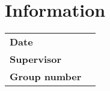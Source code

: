 \vspace{3 cm}

\restoregeometry
\newpage
\chapter*{Information}
\label{chap:info}

\begin{tabular}{l l}

	{\textbf{Date}} \hspace{1cm} & \hspace{1cm} {\datum}\\[0,2cm]
	{\textbf{Supervisor}} \hspace{1cm} & \hspace{1cm} {\betreuer}\\[1,2cm]
	{\textbf{Group number}} \hspace{1cm} & \hspace{1cm} {\groupnr}\\[0.2cm]

\end{tabular}